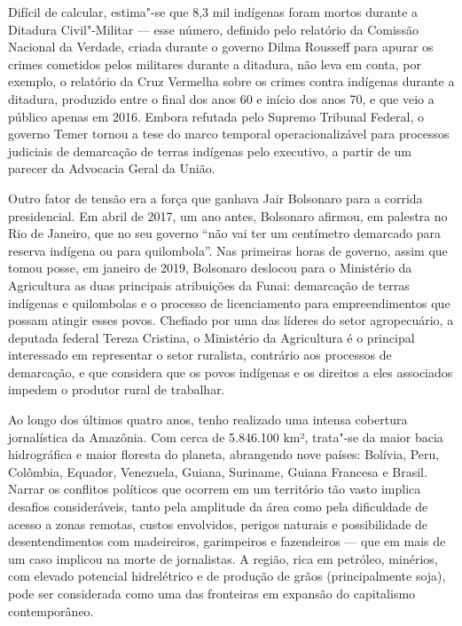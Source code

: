 Difícil de calcular, estima"-se que 8,3 mil indígenas foram mortos
durante a Ditadura Civil"-Militar --- esse número, definido pelo relatório da
Comissão Nacional da Verdade, criada durante o governo Dilma Rousseff
para apurar os crimes cometidos pelos militares durante a ditadura, não
leva em conta, por exemplo, o relatório da Cruz Vermelha sobre os crimes
contra indígenas durante a ditadura, produzido entre o final dos anos 60
e início dos anos 70, e que veio a público apenas em 2016. Embora
refutada pelo Supremo Tribunal Federal, o governo Temer tornou a tese do
marco temporal operacionalizável para processos judiciais de demarcação
de terras indígenas pelo executivo, a partir de um parecer da Advocacia
Geral da União.

Outro fator de tensão era a força que ganhava Jair Bolsonaro para a
corrida presidencial. Em abril de 2017, um ano antes, Bolsonaro afirmou,
em palestra no Rio de Janeiro, que no seu governo ``não vai ter um
centímetro demarcado para reserva indígena ou para quilombola''. Nas
primeiras horas de governo, assim que tomou posse, em janeiro de 2019,
Bolsonaro deslocou para o Ministério da Agricultura as duas principais
atribuições da Funai: demarcação de terras indígenas e quilombolas e o
processo de licenciamento para empreendimentos que possam atingir esses
povos. Chefiado por uma das líderes do setor agropecuário, a deputada
federal Tereza Cristina, o Ministério da Agricultura é o principal
interessado em representar o setor ruralista, contrário aos processos
de demarcação, e que considera que os povos indígenas e os direitos a
eles associados impedem o produtor rural de trabalhar.

\asterisc

Ao longo dos últimos quatro anos, tenho realizado uma intensa cobertura
jornalística da Amazônia. Com cerca de 5.846.100 km², trata"-se da maior
bacia hidrográfica e maior floresta do planeta, abrangendo nove países:
Bolívia, Peru, Colômbia, Equador, Venezuela, Guiana, Suriname, Guiana
Francesa e Brasil. Narrar os conflitos políticos que ocorrem em um
território tão vasto implica desafios consideráveis, tanto pela
amplitude da área como pela dificuldade de acesso a zonas remotas,
custos envolvidos, perigos naturais e possibilidade de desentendimentos
com madeireiros, garimpeiros e fazendeiros --- que em mais de um caso
implicou na morte de jornalistas. A região, rica em petróleo, minérios,
com elevado potencial hidrelétrico e de produção de grãos
(principalmente soja), pode ser considerada como uma das fronteiras em
expansão do capitalismo contemporâneo.


